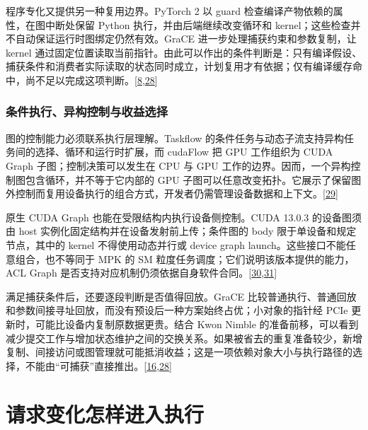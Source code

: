 \documentclass[
  UTF8,
  zihao=5]{ctexart}
\begin{document}
程序专化又提供另一种复用边界。PyTorch 2 以 guard
检查编译产物依赖的属性，在图中断处保留 Python
执行，并由后端继续改变循环和
kernel；这些检查并不自动保证运行时图绑定仍然有效。GraCE
进一步处理捕获约束和参数复制，让 kernel
通过固定位置读取当前指针。由此可以作出的条件判断是：只有编译假设、捕获条件和消费者实际读取的状态同时成立，计划复用才有依据；仅有编译缓存命中，尚不足以完成这项判断。{[}\protect\hyperlink{ref-ansel2024pytorch2}{8},\protect\hyperlink{ref-ghosh2026grace}{28}{]}

\hypertarget{ux6761ux4ef6ux6267ux884cux5f02ux6784ux63a7ux5236ux4e0eux6536ux76caux9009ux62e9}{%
\subsubsection{条件执行、异构控制与收益选择}\label{ux6761ux4ef6ux6267ux884cux5f02ux6784ux63a7ux5236ux4e0eux6536ux76caux9009ux62e9}}

图的控制能力必须联系执行层理解。Taskflow
的条件任务与动态子流支持异构任务间的选择、循环和运行时扩展，而 cudaFlow
把 GPU 工作组织为 CUDA Graph 子图；控制决策可以发生在 CPU 与 GPU
工作的边界。因而，一个异构控制图包含循环，并不等于它内部的 GPU
子图可以任意改变拓扑。它展示了保留图外控制而复用设备执行的组合方式，开发者仍需管理设备数据和上下文。{[}\protect\hyperlink{ref-huang2022taskflow}{29}{]}

原生 CUDA Graph 也能在受限结构内执行设备侧控制。CUDA 13.0.3 的设备图须由
host 实例化固定结构并在设备发射前上传；条件图的 body
限于单设备和规定节点，其中的 kernel 不得使用动态并行或 device graph
launch。这些接口不能任意组合，也不等同于 MPK 的 SM
粒度任务调度；它们说明该版本提供的能力，ACL Graph
是否支持对应机制仍须依据自身软件合同。{[}\protect\hyperlink{ref-nvidia2026cuda1303}{30},\protect\hyperlink{ref-cheng2026mpk}{31}{]}

满足捕获条件后，还要逐段判断是否值得回放。GraCE
比较普通执行、普通回放和参数间接寻址回放，而没有预设后一种方案始终占优；小对象的指针经
PCIe 更新时，可能比设备内复制原数据更贵。结合 Kwon Nimble
的准备前移，可以看到减少提交工作与增加状态维护之间的交换关系。如果被省去的重复准备较少，新增复制、间接访问或图管理就可能抵消收益；这是一项依赖对象大小与执行路径的选择，不能由``可捕获''直接推出。{[}\protect\hyperlink{ref-kwon2020nimble}{16},\protect\hyperlink{ref-ghosh2026grace}{28}{]}

\hypertarget{ux8bf7ux6c42ux53d8ux5316ux600eux6837ux8fdbux5165ux6267ux884c}{%
\section{请求变化怎样进入执行}\label{ux8bf7ux6c42ux53d8ux5316ux600eux6837ux8fdbux5165ux6267ux884c}}
\end{document}
